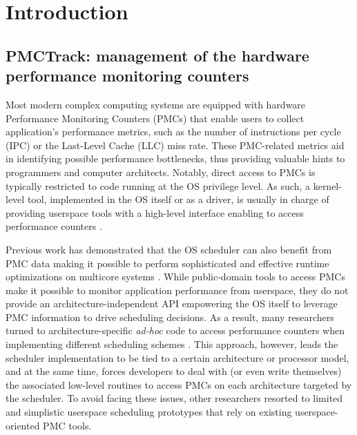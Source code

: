 \chapter{Introduction}


\section{PMCTrack: management of the hardware performance monitoring
counters}\label{pmctrack-management-of-the-hardware-performance-monitoring-counters}

Most modern complex computing systems are equipped with hardware
Performance Monitoring Counters (PMCs) that enable users to collect
application's performance metrics, such as the number of instructions
per cycle (IPC) or the Last-Level Cache (LLC) miss rate. These
PMC-related metrics aid in identifying possible performance bottlenecks,
thus providing valuable hints to programmers and computer architects.
Notably, direct access to PMCs is typically restricted to code running
at the OS privilege level. As such, a kernel-level tool, implemented in
the OS itself or as a driver, is usually in charge of providing
userspace tools with a high-level interface enabling to access
performance counters \cite{perfevents,perfmon2,oprofile}.

Previous work has demonstrated that the OS scheduler can also benefit
from PMC data making it possible to perform sophisticated and effective
runtime optimizations on multicore systems
\cite{observations,cache-aware-asplos,merkel-eurosys10,akula,intel-amp,camp,petrucci-tecs15,acfs}.
While public-domain tools to access PMCs make it possible to monitor
application performance from userspace, they do not provide an
architecture-independent API empowering the OS itself to leverage PMC
information to drive scheduling decisions. As a result, many researchers
turned to architecture-specific \textit{ad-hoc} code to access
performance counters when implementing different scheduling schemes
\cite{observations,intel-amp,camp,acfs}. This approach, however, leads
the scheduler implementation to be tied to a certain architecture or
processor model, and at the same time, forces developers to deal with
(or even write themselves) the associated low-level routines to access
PMCs on each architecture targeted by the scheduler. To avoid facing
these issues, other researchers resorted to limited and simplistic
userspace scheduling prototypes
\cite{cache-aware-asplos,akula,petrucci-tecs15} that rely on existing
userspace-oriented PMC tools.

